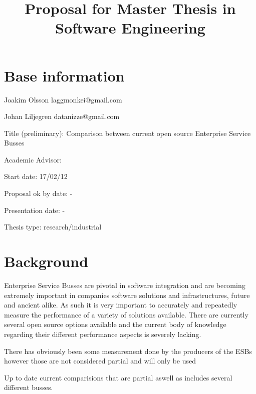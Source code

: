 \documentclass[10pt,a4paper]{proposal}
\title{Proposal for Master Thesis in Software Engineering}
\begin{document}
\maketitle
\thispagestyle{fancy}


\section*{Base information}

Joakim Olsson laggmonkei@gmail.com

Johan Liljegren datanizze@gmail.com

Title (preliminary): Comparison between current open source Enterprise Service Busses

Academic Advisor:  

Start date: 17/02/12

Proposal ok by date: -

Presentation date: -


Thesis type: research\slash industrial


\section*{Background}

Enterprise Service Busses \cite{falko07} are pivotal in software integration and are becoming extremely important in companies software solutions and  infrastructures, future and ancient alike. \cite{fenner03}
As such it is very important to accurately and repeatedly measure the performance of a variety of solutions available. 
There are currently several open source options available \cite{mehta11} and the current body of knowledge regarding their different performance aspects is severely lacking.

There has obviously been some measurement done by the producers of the ESBs however those are not considered partial and will only be used 

Up to date current comparisions that are partial aswell as includes several different busses.
\end{document}
